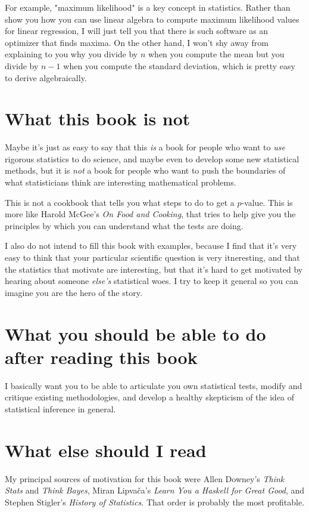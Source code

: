 For example, "maximum likelihood" is a key concept in statistics. Rather than
show you how you can use linear algebra to compute maximum likelihood values
for linear regression, I will just tell you that there is such software as an
optimizer that finds maxima. On the other hand, I won't shy away from
explaining to you why you divide by $n$ when you compute the mean but you
divide by $n-1$ when you compute the standard deviation, which is pretty easy
to derive algebraically.

\section*{What this book is not}

Maybe it's just as easy to say that this \emph{is} a book for people who want
to \emph{use} rigorous statistics to do science, and maybe even to develop some
new statistical methods, but it is \emph{not} a book for people who want to
push the boundaries of what statisticians think are interesting mathematical
problems.

This is not a cookbook that tells you what steps to do to get a $p$-value. This
is more like Harold McGee's \textit{On Food and Cooking}, that tries to help
give you the principles by which you can understand what the tests are doing.

I also do not intend to fill this book with examples, because I find that it's
very easy to think that your particular scientific question is very
itneresting, and that the statistics that motivate are interesting, but that
it's hard to get motivated by hearing about someone \emph{else's} statistical
woes. I try to keep it general so you can imagine you are the hero of the story.

\section*{What you should be able to do after reading this book}

I basically want you to be able to articulate you own statistical tests, modify
and critique existing methodologies, and develop a healthy skepticism of the
idea of statistical inference in general.

\section*{What else should I read}

My principal sources of motivation for this book were Allen Downey's
\textit{Think Stats} and \textit{Think Bayes}, Miran Lipva\v{c}a's
\textit{Learn You a Haskell for Great Good}, and Stephen Stigler's
\textit{History of Statistics}. That order is probably the most profitable.
